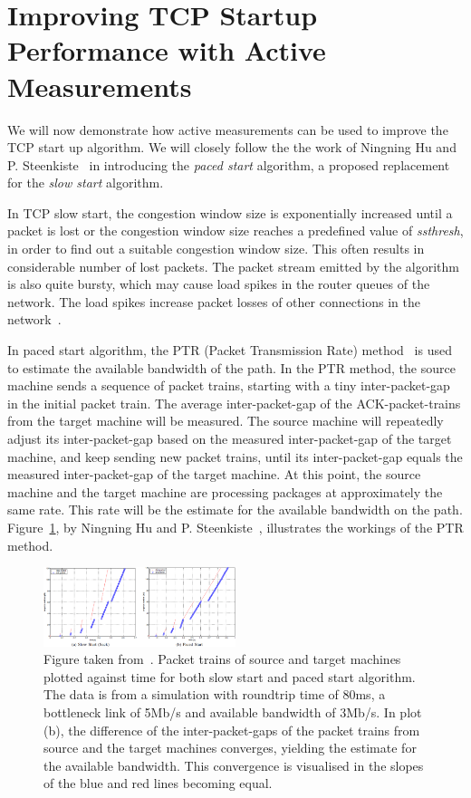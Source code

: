 
\section{Improving TCP Startup Performance with Active Measurements}

We will now demonstrate how active measurements can be used to improve the TCP start up algorithm. We will closely follow the the work of Ningning Hu and P. Steenkiste~\cite{Hu03} in introducing the \textit{paced start} algorithm, a proposed replacement for the \textit{slow start} algorithm.

In TCP slow start, the congestion window size is exponentially increased until a packet is lost or the congestion window size reaches a predefined value of \textit{ssthresh}, in order to find out a suitable congestion window size. This often results in considerable number of lost packets. The packet stream emitted by the algorithm is also quite bursty, which may cause load spikes in the router queues of the network. The load spikes increase packet losses of other connections in the network~\cite{Hu03}.    

In paced start algorithm, the PTR (Packet Transmission Rate) method~\cite{Hu03b} is used to estimate the available bandwidth of the path. In the PTR method, the source machine sends a sequence of packet trains, starting with a tiny inter-packet-gap in the initial packet train. The average inter-packet-gap of the ACK-packet-trains from the target machine will be measured. The source machine will repeatedly adjust its inter-packet-gap based on the measured inter-packet-gap of the target machine, and keep sending new packet trains, until its inter-packet-gap equals the measured inter-packet-gap of the target machine. At this point, the source machine and the target machine are processing packages at approximately the same rate. This rate will be the estimate for the available bandwidth on the path. Figure~\ref{fig:PTR}, by Ningning Hu and P. Steenkiste~\cite{Hu03}, illustrates the workings of the PTR method.

\begin{figure}
	\includegraphics[width=0.5\textwidth]{images/hu03_PTR.png}
	\caption{Figure taken from~\cite{Hu03}. Packet trains of source and target machines plotted against time for both slow start and paced start algorithm. The data is from a simulation with roundtrip time of 80ms, a bottleneck link of 5Mb/s and available bandwidth of 3Mb/s. In plot (b), the difference of the inter-packet-gaps of the packet trains from source and the target machines converges, yielding the estimate for the available bandwidth. This convergence is visualised in the slopes of the blue and red lines becoming equal.}
	\label{fig:PTR}
\end{figure}

